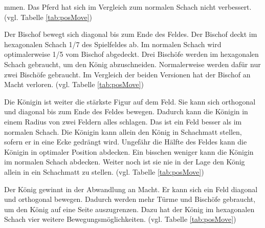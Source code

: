mmen. Das Pferd hat sich im Vergleich zum normalen Schach nicht verbessert. \cite{GlinskiHexaChess} (vgl. Tabelle \ref{tab:posMove})\par
Der Bischof bewegt sich diagonal bis zum Ende des Feldes. Der Bischof deckt im hexagonalen Schach 1/7 des Spielfeldes ab. Im normalen Schach wird optimalerweise 1/5 vom Bischof abgedeckt. Drei Bischöfe werden im hexagonalen Schach gebraucht, um den König abzuschneiden. Normalerweise werden dafür nur zwei Bischöfe gebraucht. Im Vergleich der beiden Versionen hat der Bischof an Macht verloren. \cite{GlinskiHexaChess} (vgl. Tabelle \ref{tab:posMove})\par
Die Königin ist weiter die stärkste Figur auf dem Feld. Sie kann sich orthogonal und diagonal bis zum Ende des Feldes bewegen. Dadurch kann die Königin in einem Radius von zwei Feldern alles schlagen. Das ist ein Feld besser als im normalen Schach. Die Königin kann allein den König in Schachmatt stellen, sofern er in eine Ecke gedrängt wird. Ungefähr die Hälfte des Feldes kann die Königin in optimaler Position abdecken. Ein bisschen weniger kann die Königin im normalen Schach abdecken. Weiter noch ist sie nie in der Lage den König allein in ein Schachmatt zu stellen. \cite{GlinskiHexaChess} (vgl. Tabelle \ref{tab:posMove})\par
Der König gewinnt in der Abwandlung an Macht. Er kann sich ein Feld diagonal und orthogonal bewegen. Dadurch werden mehr Türme und Bischöfe gebraucht, um den König auf eine Seite auszugrenzen. Dazu hat der König im hexagonalen Schach vier weitere Bewegungsmöglichkeiten. \cite{GlinskiHexaChess} (vgl. Tabelle \ref{tab:posMove})
